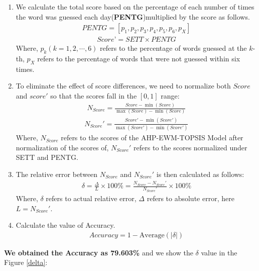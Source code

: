 \documentclass[12pt]{article}  %
\begin{document}
\begin{enumerate}
    \renewcommand{\labelenumi}{\textbf{Step \theenumi}}
\item We calculate the total score based on the percentage of each number of times the word was guessed each day(\textbf{PENTG})multiplied by the score as follows.
\begin{eqnarray}
PENTG=[p_1,p_2,p_3,p_4,p_5,p_6,p_X]
\end{eqnarray}
\begin{eqnarray}
Score’=SETT\times PENTG 
\end{eqnarray}
Where, $p_k(k=1,2,\cdots,6)$ refers to the percentage of words guessed at the $k$-th, $p_X$ refers to the percentage of words that were not guessed within six times.
\item To eliminate the effect of score differences, we need to normalize both $Score$ and $score'$ so that the scores fall in the $[0,1]$ range:
\begin{eqnarray}
N_{Score}=\frac{Score-\min(Score)}{\max(Score)-\min(Score)}
\end{eqnarray}
\begin{eqnarray}
N_{Score}'=\frac{Score'-\min(Score')}{\max(Score')-\min(Score')}
\end{eqnarray}
Where, $N_{Score}$ refers to the scores of the AHP-EWM-TOPSIS Model after normalization of the scores of, $N_{Score}'$ refers to the scores normalized under SETT and PENTG. 
\item The relative error between $N_{Score}$ and $N_{Score}'$ is then calculated as follows:
\begin{eqnarray}
\delta =\frac{\Delta}{L}\times 100\%=\frac{N_{Score}-N_{Score}'}{N_{Score}'}\times 100\%
\end{eqnarray}
Where, $\delta$ refers to actual relative error, $\Delta$ refers to absolute error, here $L=N_{Score}'$.
\item Calculate the value of Accuracy.
\begin{eqnarray}
Accuracy=1-\mathrm{Average}(|\delta|)
\end{eqnarray}
\end{enumerate}
\textbf{We obtained the Accuracy as 79.603\%} and we show the $\delta$ value in the Figure \ref{delta}:
\end{document}
